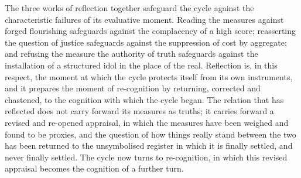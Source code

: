 The three works of reflection together safeguard the cycle against the characteristic failures of its evaluative moment. Reading the measures against forged flourishing safeguards against the complacency of a high score; reasserting the question of justice safeguards against the suppression of cost by aggregate; and refusing the measure the authority of truth safeguards against the installation of a structured idol in the place of the real. Reflection is, in this respect, the moment at which the cycle protects itself from its own instruments, and it prepares the moment of re-cognition by returning, corrected and chastened, to the cognition with which the cycle began. The relation that has reflected does not carry forward its measures as truths; it carries forward a revised and re-opened appraisal, in which the measures have been weighed and found to be proxies, and the question of how things really stand between the two has been returned to the unsymbolised register in which it is finally settled, and never finally settled. The cycle now turns to re-cognition, in which this revised appraisal becomes the cognition of a further turn.
